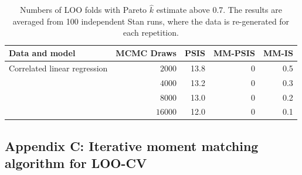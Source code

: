 \documentclass[12pt]{article}
\begin{document}
\begin{table}[t]
\centering
\begin{tabular}{ l r r r r }
\hline
Data and model & MCMC Draws & PSIS & MM-PSIS & MM-IS \\
\hline


Correlated linear regression       & $2000$  & 13.8 & 0      & 0.5 \\
                                   & $4000$  & 13.2 & 0      & 0.3 \\
                                   & $8000$  & 13.0 & 0      & 0.2 \\
                                   & $16000$ & 12.0 & 0      & 0.1 \\
\hline
\end{tabular}
\caption{Numbers of LOO folds with Pareto $\hat{k}$ estimate above 0.7. The results are averaged from 100 independent Stan runs, where the data is re-generated for each repetition.}
\label{tab:results_randomized}
\end{table}











\subsection*{Appendix C: Iterative moment matching algorithm for LOO-CV}
\end{document}
